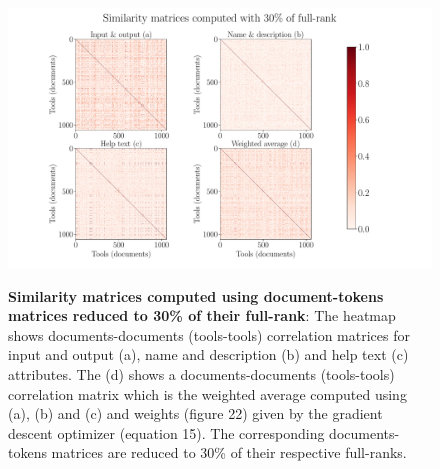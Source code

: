 \begin{figure}[h]
\begin{centering}
    {\includegraphics[scale=0.4]{figures/Similarity_matrices_030.pdf}}
    \caption[Similarity matrices computed using document-tokens matrices reduced to 30\% of their full-rank]{\textbf{Similarity matrices computed using document-tokens matrices reduced to 30\% of their full-rank}: The heatmap shows documents-documents (tools-tools) correlation matrices for input and output (a), name and description (b) and help text (c) attributes. The (d) shows a documents-documents (tools-tools) correlation matrix which is the weighted average computed using (a), (b) and (c) and weights (figure 22) given by the gradient descent optimizer (equation 15). The corresponding documents-tokens matrices are reduced to 30\% of their respective full-ranks.}
\end{centering}
\end{figure}

